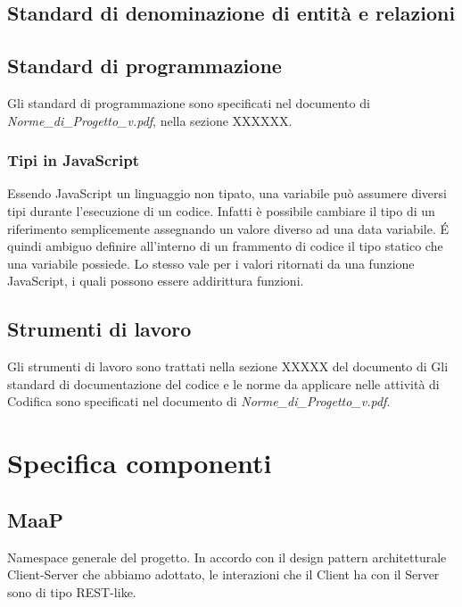 \subsection{Standard di denominazione di entità e relazioni}

\subsection{Standard di programmazione}
Gli standard di programmazione sono specificati nel documento di 
\emph{Norme\_{}di\_{}Progetto\_{}v\versioneNormeDiProgetto{}.pdf}, nella sezione XXXXXX.	%
\subsubsection{Tipi in JavaScript}
Essendo JavaScript un linguaggio non tipato, una variabile può assumere diversi tipi durante l'esecuzione
di un codice. Infatti è possibile cambiare il tipo di un riferimento semplicemente assegnando un valore diverso ad
una data variabile. \'{E} quindi ambiguo definire all'interno di un frammento di codice il tipo statico che una variabile
possiede. Lo stesso vale per i valori ritornati da una funzione JavaScript, i quali possono essere addirittura funzioni.

\subsection{Strumenti di lavoro}
Gli strumenti di lavoro sono trattati nella sezione XXXXX del documento di					%
Gli standard di documentazione del codice e le norme da applicare nelle attività 
di Codifica sono specificati nel documento di 
\emph{Norme\_{}di\_{}Progetto\_{}v\versioneNormeDiProgetto{}.pdf}.


\newpage


\section{Specifica componenti}

\subsection{MaaP}
Namespace generale del progetto. In accordo con il design pattern architetturale Client-Server che 
abbiamo adottato, le interazioni che il Client ha con il Server sono di tipo REST-like.

